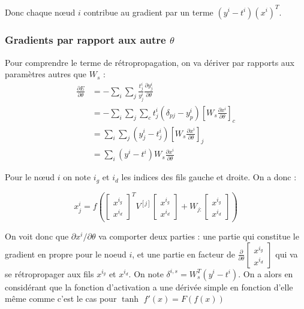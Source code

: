 \documentclass[conference]{IEEEtran}
\begin{document}
Donc chaque nœud $i$ contribue au gradient par un terme $(y^i-t^i)(x^i)^T$.

\subsubsection{Gradients par rapport aux autre $\theta$}
Pour comprendre le terme de rétropropagation, on va dériver par rapports aux paramètres autres que $W_s$ :
\begin{align*}
\frac{\partial E}{\partial \theta} &= -\sum_i\sum_j \frac{t_j^i}{y_j^i} \frac{\partial y_j^i}{\partial \theta}\\
&=-\sum_i\sum_j \sum_c t_j^i(\delta_{pj}-y_p^i)\left[W_s\frac{\partial{x^i}}{\partial\theta}\right]_c\\
&= \sum_i\sum_j (y_j^i -t_j^i)\left[W_s\frac{\partial{x^i}}{\partial\theta}\right]_j\\
&=\sum_i (y^i-t^i)W_s\frac{\partial{x^i}}{\partial\theta}
\end{align*}

Pour le nœud $i$ on note $i_g$ et $i_d$ les indices des fils gauche et droite. On a donc :

$$x^i_j=f\left( \begin{bmatrix} x^{i_g} \\ x^{i_d} \end{bmatrix}^T V^{[j]}\begin{bmatrix} x^{i_g} \\ x^{i_d} \end{bmatrix} + W_{j:}\begin{bmatrix} x^{i_g} \\ x^{i_d} \end{bmatrix}\right)$$

On voit donc que $\partial x^i / \partial \theta$ va comporter deux parties : une partie qui constitue le gradient en propre pour le noeud $i$, et une partie en facteur de $\frac{\partial}{\partial\theta}\begin{bmatrix} x^{i_g} \\ x^{i_d} \end{bmatrix}$ qui va se rétropropager aux fils $x^{i_g}$ et $x^{i_d}$.
On note $\delta^{i,s}=W_s^T(y^i-t^i)$. On a alors en considérant que la fonction d'activation a une dérivée simple en fonction d'elle même comme c'est le cas pour $\tanh$ $f'(x)=F(f(x))$
\end{document}
